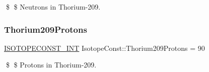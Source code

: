 \$ \$ Neutrons in Thorium-\/209. \mbox{\label{group___isotope_const-_thorium-_th209_gac0ce698b60a3d6cfa46812bf5f6dd4f8}} 
\subsubsection{\texorpdfstring{Thorium209\+Protons}{Thorium209Protons}}
{\footnotesize\ttfamily \mbox{\hyperlink{group___isotope_const-_macros_ga5f18360b3e99483a35c32d789e62621c}{I\+S\+O\+T\+O\+P\+E\+C\+O\+N\+S\+T\+\_\+\+I\+NT}} Isotope\+Const\+::\+Thorium209\+Protons = 90}

\$ \$ Protons in Thorium-\/209. 
